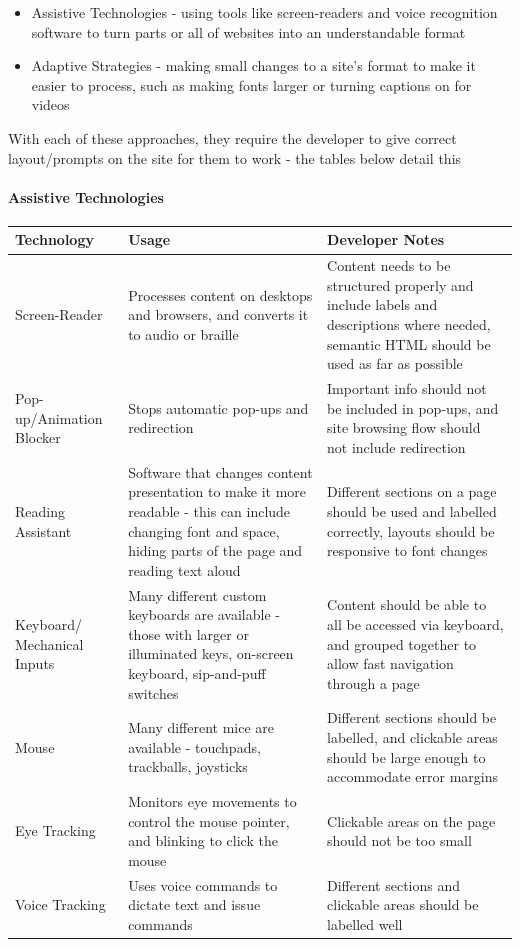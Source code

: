 \documentclass[ %
                    author={Aleena Baig},
                supervisor={Dr Simon Lock},
                    degree={BSc},
                     title={On Making Web Accessible Graphs},
                  subtitle={},
                      year={2019} ]{dissertation}
\begin{document}
\begin{itemize}
    \item Assistive Technologies - using tools like screen-readers and voice recognition software to turn parts or all of websites into an understandable format
    \item Adaptive Strategies - making small changes to a site's format to make it easier to process, such as making fonts larger or turning captions on for videos
\end{itemize}

With each of these approaches, they require the developer to give correct layout/prompts on the site for them to work - the tables below detail this

\paragraph{Assistive Technologies}

\begin{center}
\begin{longtable}{|p{3cm}|p{5cm}|p{5cm}|}
 \hline
 Technology & Usage & Developer Notes \\ [0.5ex]
 \hline \hline
 Screen-Reader & Processes content on desktops and browsers, and converts it to audio or braille & Content needs to be structured properly and include labels and descriptions where needed, semantic HTML should be used as far as possible \\
 \hline
 Pop-up/Animation Blocker & Stops automatic pop-ups and redirection & Important info should not be included in pop-ups, and site browsing flow should not include redirection \\
 \hline
 Reading Assistant & Software that changes content presentation to make it more readable - this can include changing font and space, hiding parts of the page and reading text aloud & Different sections on a page should be used and labelled correctly, layouts should be responsive to font changes \\
 \hline
 Keyboard/ Mechanical Inputs & Many different custom keyboards are available - those with larger or illuminated keys, on-screen keyboard, sip-and-puff switches  & Content should be able to all be accessed via keyboard, and grouped together to allow fast navigation through a page \\
 \hline
 Mouse & Many different mice are available - touchpads, trackballs, joysticks & Different sections should be labelled, and clickable areas should be large enough to accommodate error margins\\
 \hline
 Eye Tracking & Monitors eye movements to control the mouse pointer, and blinking to click the mouse & Clickable areas on the page should not be too small \\
 \hline
 Voice Tracking & Uses voice commands to dictate text and issue commands & Different sections and clickable areas should be labelled well \\ [1ex]
 \hline
\end{longtable}
\end{center}
\end{document}
